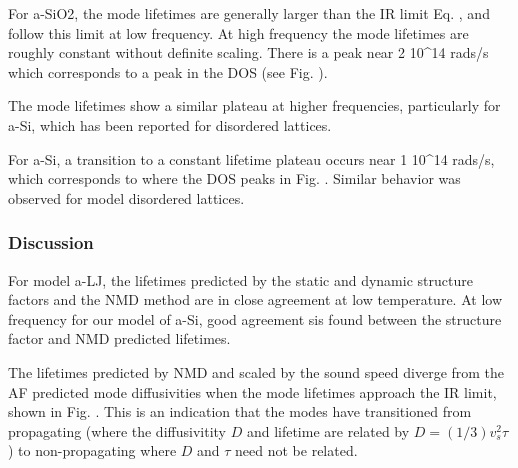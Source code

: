 \documentclass[aps,prb,twocolumn,superscriptaddress,footinbib,amsmath,amssymb,floatfix]{revtex4}
\begin{document}
For a-SiO2, the mode lifetimes are generally larger than the 
IR limit Eq. , and follow this limit at low frequency. 
At high frequency the mode lifetimes are roughly constant 
without definite scaling. There is a peak near 
2 10^{14} rads/s which corresponds to a peak in the DOS (see Fig. ).  

The mode lifetimes show a similar 
plateau at higher frequencies, particularly for a-Si, which has been 
reported for disordered lattices.\cite{larkin_predicting_2013}

For a-Si, a transition to a constant lifetime plateau occurs near 
1 10^{14} rads/s, which corresponds to where the DOS peaks in Fig. . 
Similar behavior was observed for model disordered lattices.
\cite{he_heat_2011,larkin_predicting_2013} 





\subsubsection{\label{S:Life_NMD}Discussion}

For model a-LJ, the lifetimes predicted by the static and dynamic 
structure factors and the NMD method are in close agreement 
at low temperature.\cite{mazzacurati_low-frequency_1996} 
At low frequency for our model of a-Si, good 
agreement sis found between the structure factor and NMD predicted 
lifetimes.

The lifetimes predicted by NMD and scaled by the sound speed 
diverge from the AF predicted mode diffusivities when the mode 
lifetimes approach the IR limit, shown in 
Fig. . This is an indication that the modes have transitioned 
from propagating (where the diffusivitity $D$ and lifetime are 
related by $D = (1/3)v^2_s\tau$) to non-propagating where 
$D$ and $\tau$ need not be related.
\cite{allen_thermal_1993,feldman_thermal_1993,feldman_numerical_1999,
allen_evolution_1998}
\end{document}
